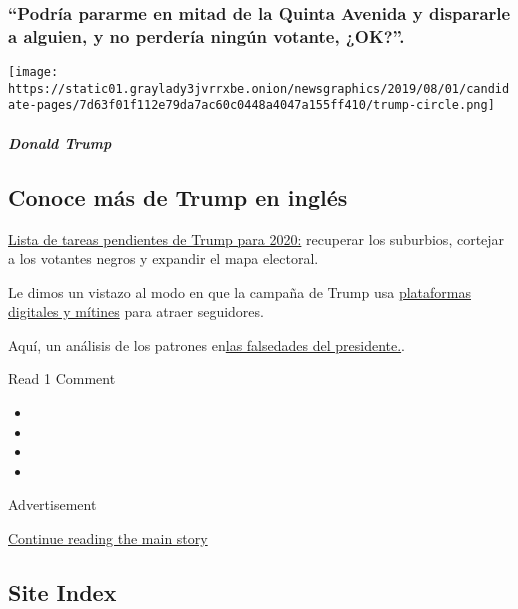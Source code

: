 \hypertarget{podruxeda-pararme-en-mitad-de-la-quinta-avenida-y-dispararle-a-alguien-y-no-perderuxeda-ninguxfan-votante-ok}{%
\subsubsection{``Podría pararme en mitad de la Quinta Avenida y
dispararle a alguien, y no perdería ningún votante,
¿OK?''.}\label{podruxeda-pararme-en-mitad-de-la-quinta-avenida-y-dispararle-a-alguien-y-no-perderuxeda-ninguxfan-votante-ok}}

\texttt{[image: https://static01.graylady3jvrrxbe.onion/newsgraphics/2019/08/01/candidate-pages/7d63f01f112e79da7ac60c0448a4047a155ff410/trump-circle.png]}

\hypertarget{donald-trump-1}{%
\subparagraph{Donald Trump}\label{donald-trump-1}}

\hypertarget{conoce-muxe1s-de-trump-en-ingluxe9s}{%
\subsection{Conoce más de Trump en
inglés}\label{conoce-muxe1s-de-trump-en-ingluxe9s}}

\href{https://www.nytimes3xbfgragh.onion/2020/02/08/us/politics/trump-reelection-campaign.html}{Lista
de tareas pendientes de Trump para 2020:} recuperar los suburbios,
cortejar a los votantes negros y expandir el mapa electoral.

Le dimos un vistazo al modo en que la campaña de Trump usa
\href{https://www.nytimes3xbfgragh.onion/2020/02/27/us/politics/trump-rally-campaign-data.html}{plataformas
digitales y mítines} para atraer seguidores.

Aquí, un análisis de los patrones
en\href{https://www.nytimes3xbfgragh.onion/2018/12/29/us/politics/trump-fact-check.html}{las
falsedades del presidente.}.

Read 1 Comment

\begin{itemize}
\item
\item
\item
\item
\end{itemize}

Advertisement

\protect\hyperlink{after-bottom}{Continue reading the main story}

\hypertarget{site-index}{%
\subsection{Site Index}\label{site-index}}

